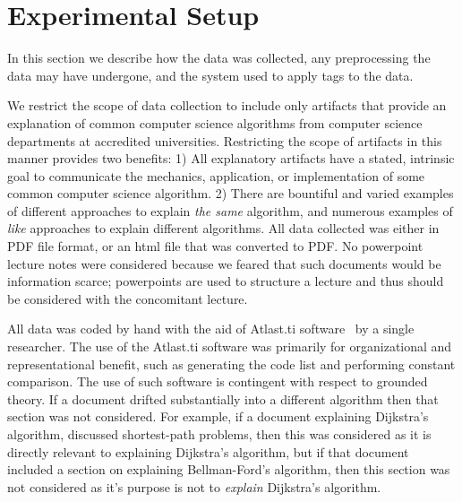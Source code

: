 \documentclass[sigconf]{acmart}
\begin{document}

\section{Experimental Setup}
\label{sec:exp:data}
In this section we describe how the data was collected, any preprocessing the
data may have undergone, and the system used to apply tags to the data. 

We restrict the scope of data collection to include only artifacts that provide
an explanation of common computer science algorithms from computer science
departments at accredited universities. Restricting the scope of artifacts in
this manner provides two benefits: 1) All explanatory artifacts have a stated,
intrinsic goal to communicate the mechanics, application, or implementation of
some common computer science algorithm. 2) There are bountiful and varied
examples of different approaches to explain \emph{the same} algorithm, and
numerous examples of \emph{like} approaches to explain different algorithms. All
data collected was either in PDF file format, or an html file that was converted
to PDF. No powerpoint lecture notes were considered because we feared that such
documents would be information scarce; powerpoints are used to structure a
lecture and thus should be considered with the concomitant lecture.

All data was coded by hand with the aid of Atlast.ti software~\cite{atlast} by a
single researcher. The use of the Atlast.ti software was primarily for
organizational and representational benefit, such as generating the code list
and performing constant comparison.
%
The use of such software is contingent with respect to grounded theory.
%
If a document drifted substantially into a different algorithm then that section
was not considered. For example, if a document explaining Dijkstra's algorithm,
discussed shortest-path problems, then this was considered as it is directly
relevant to explaining Dijkstra's algorithm, but if that document included a
section on explaining Bellman-Ford's algorithm, then this section was not
considered as it's purpose is not to \emph{explain} Dijkstra's algorithm.
\end{document}
